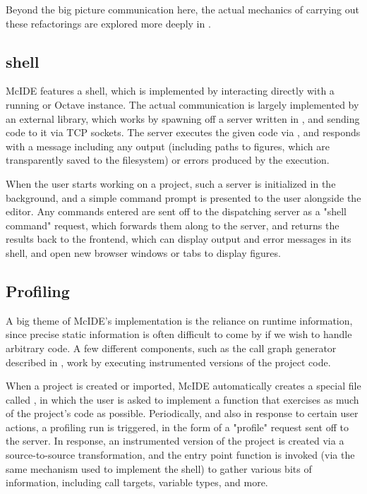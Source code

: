 Beyond the big picture communication here, the actual mechanics of carrying out
these refactorings are explored more deeply in
.

\subsection{\matlab shell}

McIDE features a \matlab shell, which is implemented by interacting directly
with a running \matlab or Octave instance. The actual communication is largely
implemented by an external library, which works by spawning off a server
written in \matlab, and sending code to it via TCP sockets. The server executes
the given code via , and responds with a message including any
output (including paths to figures, which are transparently saved to the
filesystem) or errors produced by the execution.

When the user starts working on a project, such a \matlab server is initialized
in the background, and a simple command prompt is presented to the user
alongside the editor. Any commands entered are sent off to the dispatching
server as a "shell command" request, which forwards them along to the \matlab
server, and returns the results back to the frontend, which can display output
and error messages in its shell, and open new browser windows or tabs to
display figures.

\subsection{Profiling}

A big theme of McIDE's implementation is the reliance on runtime information,
since precise static information is often difficult to come by if we wish to
handle arbitrary \matlab code. A few different components, such as the call
graph generator described in , work
by executing instrumented versions of the project code.

When a project is created or imported, McIDE automatically creates a special
file called , in which the user is asked to implement
a function that exercises as much of the project's code as possible.
Periodically, and also in response to certain user actions, a profiling run is
triggered, in the form of a "profile" request sent off to the server. In
response, an instrumented version of the project is created via a
source-to-source transformation, and the entry point function is invoked (via
the same mechanism used to implement the \matlab shell) to gather various bits
of information, including call targets, variable types, and more.
